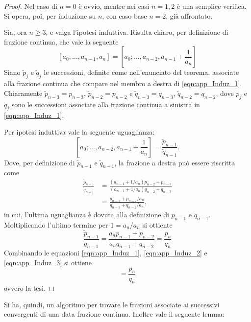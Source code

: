 \begin{proof}
 Nel caso di $n=0$ è ovvio, mentre nei casi $n=1,2$ è una semplice verifica.
 Si opera, poi, per induzione su $n$, con caso base $n=2$, già affrontato.
 
 Sia, ora $n \geq 3$, e valga l'ipotesi induttiva.
 Risulta chiaro, per definizione di frazione continua, che vale la seguente
 \begin{equation}\label{eqn:app_Induz_1}
  [a_0;\dots, a_{n-1}, a_n] = [a_0;\dots,a_{n-2},a_{n-1} + \frac{1}{a_n}]
 \end{equation}
 Siano $\tilde{p}_j$ e $\tilde{q}_j$ le successioni, definite come nell'enunciato del teorema, associate alla frazione continua che compare nel membro a destra di \eqref{eqn:app_Induz_1}.
 Chiaramente $\tilde{p}_{n-3} = p_{n-3}$, $\tilde{p}_{n-2} = p_{n-2}$ e $\tilde{q}_{n-3} = q_{n-3}$, $\tilde{q}_{n-2} = q_{n-2}$, dove $p_j$ e $q_j$ sono le successioni associate alla frazione continua a sinistra in \eqref{eqn:app_Induz_1}.
 
 Per ipotesi induttiva vale la seguente uguaglianza:
 \begin{equation}\label{eqn:app_Induz_2}
  [a_0;\dots,a_{n-2},a_{n-1} + \frac{1}{a_n}] = \frac{\tilde{p}_{n-1}}{\tilde{q}_{n-1}}.
 \end{equation}
 Dove, per definizione di $\tilde{p}_{n-1}$ e $\tilde{q}_{n-1}$, la frazione a destra può essere riscritta come
 \begin{align}
  \frac{\tilde{p}_{n-1}}{\tilde{q}_{n-1}} &= \frac{(a_{n-1} + 1/a_n)p_{n-2} + p_{n-3}}{(a_{n-1} + 1/a_n)q_{n-2} + q_{n-3}}\\
  &= \frac{p_{n-1} + p_{n-2}/a_n}{q_{n-1} + q_{n-2}/a_n},
 \end{align}
 in cui, l'ultima uguaglianza è dovuta alla definizione di $p_{n-1}$ e $q_{n-1}$.
 Moltiplicando l'ultimo termine per $1 = a_n/a_n$ si ottiente
 \begin{equation}\label{eqn:app_Induz_3}
  \frac{\tilde{p}_{n-1}}{\tilde{q}_{n-1}} = \frac{a_np_{n-1} + p_{n-2}}{a_nq_{n-1} + q_{n-2}} = \frac{p_n}{q_n}
 \end{equation}
 Combinando le equazioni \eqref{eqn:app_Induz_1}, \eqref{eqn:app_Induz_2} e \eqref{eqn:app_Induz_3} si ottiene
 \begin{equation}
 [a_0;\dots, a_{n-1}, a_n] = \frac{p_n}{q_n}
 \end{equation}
 ovvero la tesi.
\end{proof}
Si ha, quindi, un algoritmo per trovare le frazioni associate ai successivi convergenti di una data frazione continua. Inoltre vale il seguente lemma:
